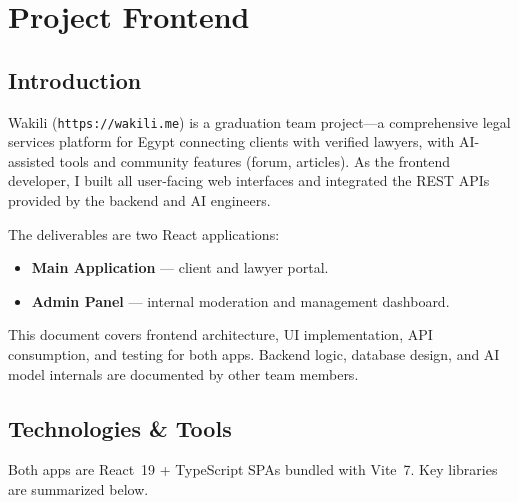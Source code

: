 
\section{Project Frontend}

\subsection{Introduction}

Wakili (\texttt{https://wakili.me}) is a graduation team project---a comprehensive legal services platform for Egypt connecting clients with verified lawyers, with AI-assisted tools and community features (forum, articles). As the frontend developer, I built all user-facing web interfaces and integrated the REST APIs provided by the backend and AI engineers.

The deliverables are two React applications:
\begin{itemize}
    \item \textbf{Main Application} --- client and lawyer portal.
    \item \textbf{Admin Panel} --- internal moderation and management dashboard.
\end{itemize}
This document covers frontend architecture, UI implementation, API consumption, and testing for both apps. Backend logic, database design, and AI model internals are documented by other team members.

\subsection{Technologies \& Tools}

Both apps are React~19 + TypeScript SPAs bundled with Vite~7. Key libraries are summarized below.

